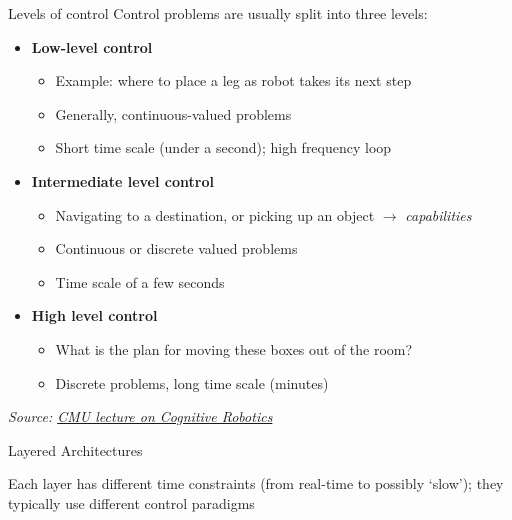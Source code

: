 \documentclass[compress]{beamer}
\newcommand{\source}[2]{{\tiny\it Source: \href{#1}{#2}}}
\begin{document}
\begin{frame}{Levels of control}
    Control problems are usually split into three levels:

    \begin{itemize}
        \item<1-> \textbf{Low-level control}
            \begin{itemize}
                \item Example: where to place a leg as robot takes its next step
                \item Generally, continuous-valued problems
                \item Short time scale (under a second); high frequency loop
            \end{itemize}
        \item<2-> \textbf{Intermediate level control}
            \begin{itemize}
                \item Navigating to a destination, or picking up an object
                    $\rightarrow$ \emph{capabilities}
                \item Continuous or discrete valued problems
                \item Time scale of a few seconds
            \end{itemize}
        \item<3-> \textbf{High level control}
            \begin{itemize}
                \item What is the plan for moving these boxes out of the room?
                \item Discrete problems, long time scale (minutes)
            \end{itemize}
    \end{itemize}

    \source{https://www.cs.cmu.edu/afs/cs/academic/class/15494-s11/lectures/architectures.pdf}{CMU lecture on Cognitive Robotics}
\end{frame}

\begin{frame}{Layered Architectures}
    \begin{center}
    \end{center}

    Each layer has different time constraints (from real-time to possibly `slow'); they typically use different control paradigms
\end{frame}
\end{document}
